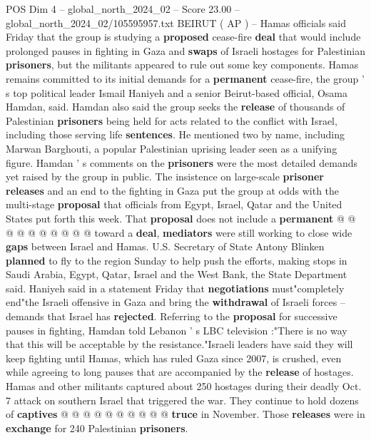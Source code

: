 \begin{textsample}{POS Dim 4 – global\_north\_2024\_02 – Score 23.00 – global\_north\_2024\_02/105595957.txt}  \label{ex:f4_pos_190}
BEIRUT ( AP ) -- Hamas officials said Friday that the group is studying a \textbf{proposed} cease-fire \textbf{deal} that would include prolonged pauses in fighting in Gaza and \textbf{swaps} of Israeli hostages for Palestinian \textbf{prisoners}, but the militants appeared to rule out some key components.
Hamas remains committed to its initial demands for a \textbf{permanent} cease-fire, the group ' s top political leader Ismail Haniyeh and a senior Beirut-based official, Osama Hamdan, said.
Hamdan also said the group seeks the \textbf{release} of thousands of Palestinian \textbf{prisoners} being held for acts related to the conflict with Israel, including those serving life \textbf{sentences}.
He mentioned two by name, including Marwan Barghouti, a popular Palestinian uprising leader seen as a unifying figure.
Hamdan ' s comments on the \textbf{prisoners} were the most detailed demands yet raised by the group in public.
The insistence on large-scale \textbf{prisoner} \textbf{releases} and an end to the fighting in Gaza put the group at odds with the multi-stage \textbf{proposal} that officials from Egypt, Israel, Qatar and the United States put forth this week.
That \textbf{proposal} does not include a \textbf{permanent} @ @ @ @ @ @ @ @ @ @ toward a \textbf{deal}, \textbf{mediators} were still working to close wide \textbf{gaps} between Israel and Hamas.
U.S.
Secretary of State Antony Blinken \textbf{planned} to fly to the region Sunday to help push the efforts, making stops in Saudi Arabia, Egypt, Qatar, Israel and the West Bank, the State Department said.
Haniyeh said in a statement Friday that \textbf{negotiations} must"completely end"the Israeli offensive in Gaza and bring the \textbf{withdrawal} of Israeli forces -- demands that Israel has \textbf{rejected}.
Referring to the \textbf{proposal} for successive pauses in fighting, Hamdan told Lebanon ' s LBC television :"There is no way that this will be acceptable by the resistance."Israeli leaders have said they will keep fighting until Hamas, which has ruled Gaza since 2007, is crushed, even while agreeing to long pauses that are accompanied by the \textbf{release} of hostages.
Hamas and other militants captured about 250 hostages during their deadly Oct. 7 attack on southern Israel that triggered the war.
They continue to hold dozens of \textbf{captives} @ @ @ @ @ @ @ @ @ @ \textbf{truce} in November.
Those \textbf{releases} were in \textbf{exchange} for 240 Palestinian \textbf{prisoners}.

\end{textsample}
